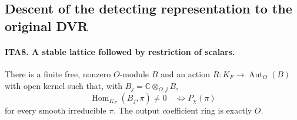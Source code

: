 \documentclass[11pt,a4paper]{article}
\numberwithin{equation}{section}
\theoremstyle{remark}\newtheorem{remark}[theorem]{Remark}
\begin{document}
\subsection{Descent of the detecting representation to the original DVR}

\paragraph{ITA8. A stable lattice followed by restriction of scalars.}
\label{claim:ITA8}
There is a finite free, nonzero $O$-module $B$ and an action
$R:K_F\to\operatorname{Aut}_O(B)$ with open kernel such
that, with $B_j=\mathbb C\otimes_{O,j}B$,
\[
              \operatorname{Hom}_{K_F}(B_j,\pi)\ne0
                             \quad\Longleftrightarrow P_\chi(\pi)
                                                               \tag{ITA.14}
\]
for every smooth irreducible $\pi$.  The output coefficient
ring is exactly $O$.
\end{document}
